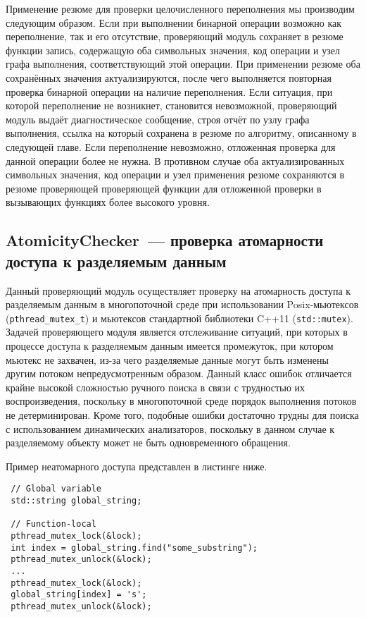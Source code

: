 Применение резюме для проверки целочисленного переполнения мы производим следующим образом. Если при выполнении бинарной операции возможно как переполнение, так и его отсутствие, проверяющий модуль сохраняет в резюме функции запись, содержащую оба символьных значения, код операции и узел графа выполнения, соответствующий этой операции. При применении резюме оба сохранённых значения актуализируются, после чего выполняется повторная проверка бинарной операции на наличие переполнения. Если ситуация, при которой переполнение не возникнет, становится невозможной, проверяющий модуль выдаёт диагностическое сообщение, строя отчёт по узлу графа выполнения, ссылка на который сохранена в резюме по алгоритму, описанному в следующей главе. Если переполнение невозможно, отложенная проверка для данной операции более не нужна. В противном случае оба актуализированных символьных значения, код операции и узел применения резюме сохраняются в резюме проверяющей проверяющей функции для отложенной проверки в вызывающих функциях более высокого уровня.

\subsection{AtomicityChecker~--- проверка атомарности доступа к разделяемым данным} \label{sect:atomicity}

Данный проверяющий модуль осуществляет проверку на атомарность доступа к разделяемым данным в многопоточной среде при использовании Posix-мьютексов (\texttt{pthread\_mutex\_t}) и мьютексов стандартной библиотеки C++11 (\texttt{std::mutex}). Задачей проверяющего модуля является отслеживание ситуаций, при которых в процессе доступа к разделяемым данным имеется промежуток, при котором мьютекс не захвачен, из-за чего разделяемые данные могут быть изменены другим потоком непредусмотренным образом. Данный класс ошибок отличается крайне высокой сложностью ручного поиска в связи с трудностью их воспроизведения, поскольку в многопоточной среде порядок выполнения потоков не детерминирован. Кроме того, подобные ошибки достаточно трудны для поиска с использованием динамических анализаторов, поскольку в данном случае к разделяемому объекту может не быть одновременного обращения.

Пример неатомарного доступа представлен в листинге ниже.

\begin{verbatim}
 // Global variable
 std::string global_string;
 
 // Function-local
 pthread_mutex_lock(&lock);
 int index = global_string.find("some_substring");
 pthread_mutex_unlock(&lock);
 ...
 pthread_mutex_lock(&lock);
 global_string[index] = 's';
 pthread_mutex_unlock(&lock);
\end{verbatim}

